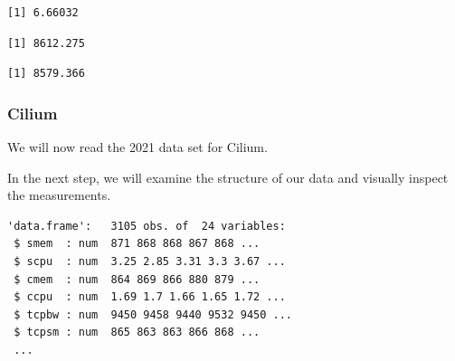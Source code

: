 \begin{verbatim}
[1] 6.66032
\end{verbatim}

\begin{Shaded}
\begin{Highlighting}[]
\SpecialCharTok{\$}
\end{Highlighting}
\end{Shaded}

\begin{verbatim}
[1] 8612.275
\end{verbatim}

\begin{Shaded}
\begin{Highlighting}[]
\SpecialCharTok{\$}
\end{Highlighting}
\end{Shaded}

\begin{verbatim}
[1] 8579.366
\end{verbatim}

\subsubsection{Cilium}

We will now read the 2021 data set for Cilium.

\begin{Shaded}
\begin{Highlighting}[]
\OtherTok{\textless{}{-}} 
\OtherTok{\textless{}{-}} \NormalTok{(}\NormalTok{,}\NormalTok{))}
\end{Highlighting}
\end{Shaded}

In the next step, we will examine the structure of our data and visually
inspect the measurements.

\begin{Shaded}
\begin{Highlighting}[]
\end{Highlighting}
\end{Shaded}

\begin{verbatim}
'data.frame':   3105 obs. of  24 variables:
 $ smem  : num  871 868 868 867 868 ...
 $ scpu  : num  3.25 2.85 3.31 3.3 3.67 ...
 $ cmem  : num  864 869 866 880 879 ...
 $ ccpu  : num  1.69 1.7 1.66 1.65 1.72 ...
 $ tcpbw : num  9450 9458 9440 9532 9450 ...
 $ tcpsm : num  865 863 863 866 868 ...
 ...
\end{verbatim}

